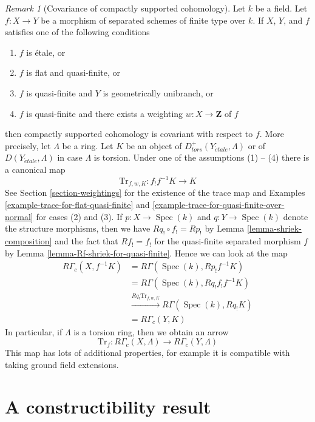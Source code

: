 \documentclass{stacks-project}
\theoremstyle{plain}
\theoremstyle{definition}
\theoremstyle{remark}
\newtheorem{remark}[subsection]{Remark}
\numberwithin{equation}{subsection}
\def\Spec{\mathop{\mathrm{Spec}}}
\def\etale{{\acute{e}tale}}
\begin{document}
\begin{remark}[Covariance of compactly supported cohomology]
\label{remark-covariance-compactly-supported}
Let $k$ be a field. Let $f : X \to Y$ be a morphism of separated
schemes of finite type over $k$. If $X$, $Y$, and $f$ satisfies one
of the following conditions
\begin{enumerate}
\item $f$ is \'etale, or
\item $f$ is flat and quasi-finite, or
\item $f$ is quasi-finite and $Y$ is geometrically unibranch, or
\item $f$ is quasi-finite and there exists a weighting
$w : X \to \mathbf{Z}$ of $f$
\end{enumerate}
then compactly supported cohomology is covariant with respect to $f$.
More precisely, let $\Lambda$ be a ring. Let $K$ be an object of
$D^+_{tors}(Y_\etale, \Lambda)$ or of $D(Y_\etale, \Lambda)$ in case
$\Lambda$ is torsion. Under one of the assumptions (1) -- (4)
there is a canonical map
$$
\text{Tr}_{f, w, K} : f_!f^{-1}K \longrightarrow K
$$
See Section \ref{section-weightings} for the existence of the
trace map and Examples \ref{example-trace-for-flat-quasi-finite} and
\ref{example-trace-for-quasi-finite-over-normal} for cases (2) and (3).
If $p : X \to \Spec(k)$ and $q : Y \to \Spec(k)$ denote
the structure morphisms, then we have $Rq_! \circ f_! = Rp_!$
by Lemma \ref{lemma-shriek-composition} and the fact that
$Rf_! = f_!$ for the quasi-finite separated morphism $f$ by
Lemma \ref{lemma-Rf-shriek-for-quasi-finite}. Hence we can look
at the map
\begin{align*}
R\Gamma_c(X, f^{-1}K)
& =
R\Gamma(\Spec(k), Rp_!f^{-1}K) \\
& =
R\Gamma(\Spec(k), Rq_!f_!f^{-1}K) \\
& \xrightarrow{Rq_!\text{Tr}_{f, w, K}}
R\Gamma(\Spec(k), Rq_!K) \\
& =
R\Gamma_c(Y, K)
\end{align*}
In particular, if $\Lambda$ is a torsion ring, then we obtain an arrow
$$
\text{Tr}_f : R\Gamma_c(X, \Lambda) \longrightarrow R\Gamma_c(Y, \Lambda)
$$
This map has lots of additional properties, for example it is
compatible with taking ground field extensions.
\end{remark}










\section{A constructibility result}
\label{section-family-smooth-curves-cohomology}
\end{document}
